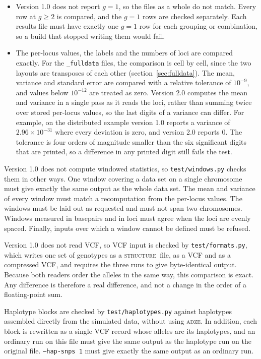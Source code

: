 \documentclass[11pt]{article}
\newcommand{\prog}{\textsc{adze}}
\newcommand{\structureprog}{\textsc{structure}}
\newcommand{\flag}[1]{\texttt{#1}}
\begin{document}
\begin{itemize}
\item Version 1.0 does not report $g = 1$, so the files as a whole do not
  match. Every row at $g \geq 2$ is compared, and the $g = 1$ rows are checked
  separately. Each results file must have exactly one $g = 1$ row for each
  grouping or combination, so a build that stopped writing them would fail.
\item The per-locus values, the labels and the numbers of loci are compared
  exactly. For the \texttt{\_fulldata} files, the comparison is cell by cell,
  since the two layouts are transposes of each other
  (section~\ref{sec:fulldata}). The mean, variance and standard error are
  compared with a relative tolerance of $10^{-9}$, and values below $10^{-12}$
  are treated as zero. Version 2.0 computes the mean and variance in a single
  pass as it reads the loci, rather than summing twice over stored per-locus
  values, so the last digits of a variance can differ. For example, on the
  distributed example version 1.0 reports a variance of $2.96 \times 10^{-31}$
  where every deviation is zero, and version 2.0 reports 0. The tolerance is
  four orders of magnitude smaller than the six significant digits that are
  printed, so a difference in any printed digit still fails the test.
\end{itemize}

Version 1.0 does not compute windowed statistics, so
\texttt{test/windows.py} checks them in other ways. One window covering a data
set on a single chromosome must give exactly the same output as the whole data
set. The mean and variance of every window must match a recomputation from
the per-locus values. The windows must be laid out as requested and must not
span two chromosomes. Windows measured in basepairs and in loci must agree when
the loci are evenly spaced. Finally, inputs over which a window cannot be
defined must be refused.

Version 1.0 does not read VCF, so VCF input is checked by
\texttt{test/formats.py}, which writes one set of genotypes as a
\structureprog\ file, as a VCF and as a compressed VCF, and requires the three
runs to give byte-identical output. Because both readers order the alleles in
the same way, this comparison is exact. Any difference is therefore a real
difference, and not a change in the order of a floating-point sum.

Haplotype blocks are checked by \texttt{test/haplotypes.py} against haplotypes
assembled directly from the simulated data, without using \prog. In addition,
each block is rewritten as a single VCF record whose alleles are its
haplotypes, and an ordinary run on this file must give the same output as the
haplotype run on the original file. \flag{--hap-snps 1} must give exactly the
same output as an ordinary run.
\end{document}
